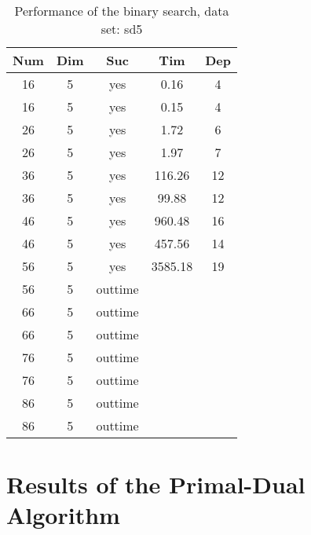 \begin{table}[!htb]
  \centering
  \begin{tabular}[center]{|c|c|c|c|c|}
    \hline
    Num & Dim & Suc & Tim & Dep \\
    \hline
    16 & 5 & yes & 0.16 & 4 \\
    16 & 5 & yes & 0.15 & 4 \\
    26 & 5 & yes & 1.72 & 6 \\
    26 & 5 & yes & 1.97 & 7 \\
    36 & 5 & yes & 116.26 & 12 \\
    36 & 5 & yes & 99.88 & 12 \\
    46 & 5 & yes & 960.48 & 16 \\
    46 & 5 & yes & 457.56 & 14 \\
    56 & 5 & yes & 3585.18 & 19 \\
    56 & 5 & outtime &&\\
    66 & 5 & outtime &&\\
    66 & 5 & outtime &  &  \\
    76 & 5 & outtime &&\\
    76 & 5 & outtime &&\\
    86 & 5 & outtime &&\\
    86 & 5 & outtime &&\\
    \hline
  \end{tabular}
  \caption{Performance of the binary search, data set: sd5}
  \label{tab:test.bin-sd5}
\end{table}

\clearpage
\section{Results of the Primal-Dual Algorithm}
\label{sec:apd.pd}

